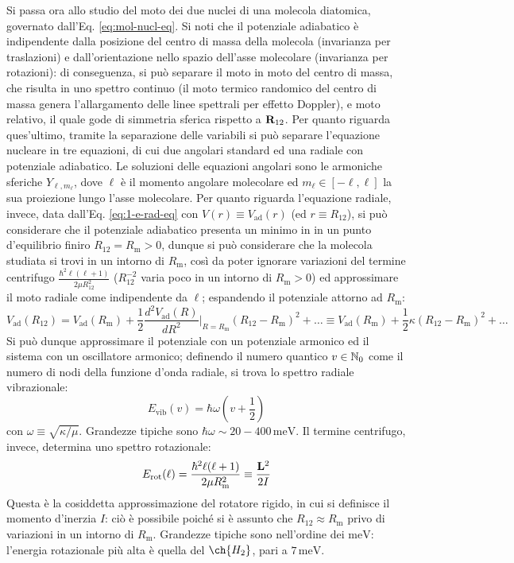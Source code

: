 Si passa ora allo studio del moto dei due nuclei di una molecola diatomica, governato dall'Eq. \ref{eq:mol-nucl-eq}. Si noti che il potenziale adiabatico è indipendente dalla posizione del centro di massa della molecola (invarianza per traslazioni) e dall'orientazione nello spazio dell'asse molecolare (invarianza per rotazioni): di conseguenza, si può separare il moto in moto del centro di massa, che risulta in uno spettro continuo (il moto termico randomico del centro di massa genera l'allargamento delle linee spettrali per effetto Doppler), e moto relativo, il quale gode di simmetria sferica rispetto a $ \mathbf{R}_{12} $. Per quanto riguarda ques'ultimo, tramite la separazione delle variabili si può separare l'equazione nucleare in tre equazioni, di cui due angolari standard ed una radiale con potenziale adiabatico. Le soluzioni delle equazioni angolari sono le armoniche sferiche $ Y_{\ell,m_\ell} $, dove $ \ell $ è il momento angolare molecolare ed $ m_\ell \in [-\ell,\ell] $ la sua proiezione lungo l'asse molecolare. Per quanto riguarda l'equazione radiale, invece, data dall'Eq. \ref{eq:1-e-rad-eq} con $ V(r) \equiv V_\text{ad}(r) $ (ed $ r \equiv R_{12} $), si può considerare che il potenziale adiabatico presenta un minimo in in un punto d'equilibrio finiro $ R_{12} = R_\text{m} > 0 $, dunque si può considerare che la molecola studiata si trovi in un intorno di $ R_\text{m} $, così da poter ignorare variazioni del termine centrifugo $ \frac{\hbar^2 \ell (\ell + 1)}{2\mu R_{12}^2} $ ($ R_{12}^{-2} $ varia poco in un intorno di $ R_\text{m} > 0 $) ed approssimare il moto radiale come indipendente da $ \ell $; espandendo il potenziale attorno ad $ R_\text{m} $:
\begin{equation*}
	V_\text{ad}(R_{12}) = V_\text{ad}(R_\text{m}) + \frac{1}{2} \frac{d^2 V_\text{ad}(R)}{dR^2}\bigg\vert_{R = R_\text{m}} (R_{12} - R_\text{m})^2 + \dots \equiv V_\text{ad}(R_\text{m}) + \frac{1}{2} \kappa (R_{12} - R_\text{m})^2 + \dots
\end{equation*}
Si può dunque approssimare il potenziale con un potenziale armonico ed il sistema con un oscillatore armonico; definendo il numero quantico $ v \in \mathbb{N}_0 $ come il numero di nodi della funzione d'onda radiale, si trova lo spettro radiale vibrazionale:
\begin{equation}
	E_\text{vib}(v) = \hbar \omega \left( v + \frac{1}{2} \right)
\end{equation}
con $ \omega \equiv \sqrt{\kappa / \mu} $. Grandezze tipiche sono $ \hbar \omega \sim 20-400 \,\text{meV} $. Il termine centrifugo, invece, determina uno spettro rotazionale:
\begin{equation}
	E_\text{rot}(\ell) = \frac{\hbar^2 \ell (\ell + 1)}{2\mu R_\text{m}^2} \equiv \frac{\mathbf{L}^2}{2I}
\end{equation}
Questa è la cosiddetta approssimazione del rotatore rigido, in cui si definisce il momento d'inerzia $ I $: ciò è possibile poiché si è assunto che $ R_{12} \approx R_\text{m} $ privo di variazioni in un intorno di $ R_\text{m} $. Grandezze tipiche sono nell'ordine dei $ \text{meV} $: l'energia rotazionale più alta è quella del $ \ch{H_2} $, pari a $ 7 \,\text{meV} $.

